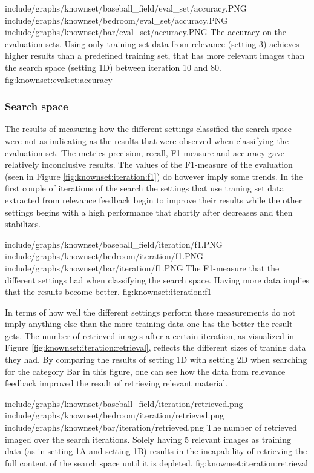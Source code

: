 \tripfigure
{include/graphs/knownset/baseball_field/eval_set/accuracy.PNG}
{include/graphs/knownset/bedroom/eval_set/accuracy.PNG}
{include/graphs/knownset/bar/eval_set/accuracy.PNG}
{The accuracy on the evaluation sets. Using only training set data from relevance (setting 3) achieves higher results than a predefined training set, that has more relevant images than the search space (setting 1D) between iteration 10 and 80.}
{fig:knownset:evalset:accuracy}

\subsubsection{Search space}
\label{sec:res:knownset:iter}

The results of measuring how the different settings classified the search space were not as indicating as the results that were observed when classifying the evaluation set. 
The metrics precision, recall, F1-measure and accuracy gave relatively inconclusive results. The values of the F1-measure of the evaluation (seen in Figure \ref{fig:knownset:iteration:f1}) do however imply some trends. In the first couple of iterations of the search the settings that use traning set data extracted from relevance feedback begin to improve their results while the other settings begins with a high performance that shortly after decreases and then stabilizes.  

\tripfigurenear
{include/graphs/knownset/baseball_field/iteration/f1.PNG}
{include/graphs/knownset/bedroom/iteration/f1.PNG}
{include/graphs/knownset/bar/iteration/f1.PNG}
{The F1-measure that the different settings had when classifying the search space. Having more data implies that the results become better.}
{fig:knownset:iteration:f1}

In terms of how well the different settings perform these measurements do not imply anything else than the more training data one has the better the result gets. The number of retrieved images after a certain iteration, as visualized in Figure \ref{fig:knownset:iteration:retrieval}, reflects the different sizes of traning data they had. By comparing the results of setting 1D with setting 2D when searching for the category Bar in this figure, one can see how the data from relevance feedback improved the result of retrieving relevant material.

\tripfigurenear
{include/graphs/knownset/baseball_field/iteration/retrieved.png}
{include/graphs/knownset/bedroom/iteration/retrieved.png}
{include/graphs/knownset/bar/iteration/retrieved.png}
{The number of retrieved imaged over the search iterations. Solely having 5 relevant images as training data (as in setting 1A and setting 1B) results in the incapability of retrieving the full content of the search space until it is depleted.}
{fig:knownset:iteration:retrieval}

